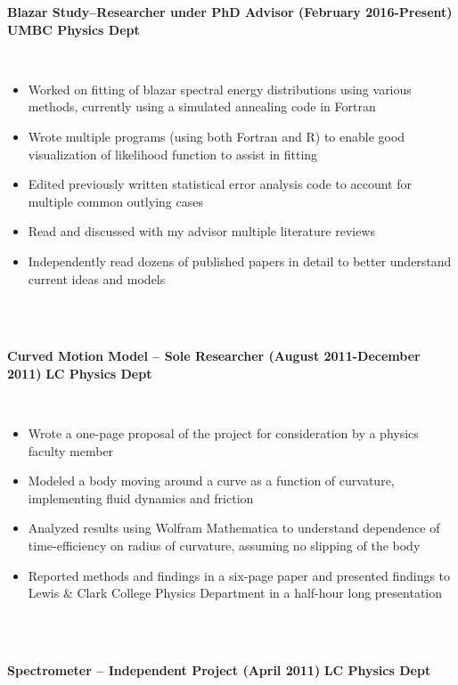 \documentclass{article}
\begin{document}
\begin{vwcol}[widths={0.8,0.2}, sep=.8cm, justify=flush, rule=0pt, indent=0em]
\noindent \textbf{Blazar Study–Researcher under PhD Advisor (February 2016-Present)}
\newpage
\noindent \textbf{UMBC Physics Dept}
\end{vwcol}
\phantom \\
\begin{itemize}
\item Worked on fitting of blazar spectral energy distributions using various methods, currently using a simulated annealing code in Fortran
\item Wrote multiple programs (using both Fortran and R) to enable good visualization of likelihood function to assist in fitting
\item Edited previously written statistical error analysis code to account for multiple common outlying cases
\item Read and discussed with my advisor multiple literature reviews
\item Independently read dozens of published papers in detail to better understand current ideas and models
\end{itemize}
\phantom \\
\phantom \\
%
%
%
%
\begin{vwcol}[widths={0.8,0.2}, sep=.8cm, justify=flush, rule=0pt, indent=0em]
\noindent \textbf{Curved Motion Model – Sole Researcher (August 2011-December 2011)}
\newpage
\noindent \textbf{LC Physics Dept}
\end{vwcol}
\phantom \\
\begin{itemize}
\item Wrote a one-page proposal of the project for consideration by a physics faculty member
\item Modeled a body moving around a curve as a function of curvature, implementing fluid dynamics and friction
\item Analyzed results using Wolfram Mathematica to understand dependence of time-efficiency on radius of curvature, assuming no slipping of the body
\item Reported methods and findings in a six-page paper and presented findings to Lewis \& Clark College Physics Department in a half-hour long presentation
\end{itemize}
\phantom \\
\phantom \\
%
%
%
%
\begin{vwcol}[widths={0.8,0.2}, sep=.8cm, justify=flush, rule=0pt, indent=0em]
\noindent \textbf{Spectrometer – Independent Project (April 2011)}
\newpage
\noindent \textbf{LC Physics Dept}
\end{vwcol}
\end{document}
